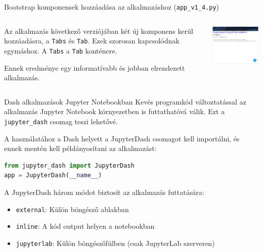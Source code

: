 \documentclass[english, aspectratio=169]{beamer}
\begin{document}
\begin{frame}[fragile]{Bootstrap komponensek hozzáadása az alkalmazáshoz (\texttt{app\_v1\_4.py})}
	\begin{columns}
		\begin{column}{.5\textwidth}
			Az alkalmazás következő verziójában két új komponens kerül hozzáadásra, a \texttt{Tabs} és \texttt{Tab}. Ezek szorosan kapcsolódnak egymáshoz. A \texttt{Tabs} a \texttt{Tab} konténere.\par\smallskip
			Ennek eredménye egy informatívabb és jobban elrendezett alkalmazás. 
		\end{column}
		\begin{column}{.5\textwidth}
			\begin{center}
				\includegraphics[width=6cm, keepaspectratio]{images/dash_11.png}
			\end{center}
		\end{column}
	\end{columns}
\end{frame}

\begin{frame}[fragile]{Dash alkalmazások Jupyter Notebookban}
	Kevés programkód változtatással az alkalmazás Jupyter Notebook környezetben is futtathatóvá válik. Ezt a \texttt{jupyter\_dash} csomag teszi lehetővé.\par\smallskip
	A használatához a Dash helyett a JupyterDash csomagot kell importálni, és ennek mentén kell példányosítani az alkalmazást:
	\begin{lstlisting}[language=python]
from jupyter_dash import JupyterDash
app = JupyterDash(__name__)
	\end{lstlisting}
	A JupyterDash három módot biztosít az alkalmazás futtatására:
	\begin{itemize}
		\item \texttt{external}: Külön böngésző ablakban
		\item \texttt{inline}: A kód output helyen a notebookban
		\item \texttt{jupyterlab}: Külön böngészőfülben (csak JupyterLab szerveren)
	\end{itemize}
\end{frame}
\end{document}
